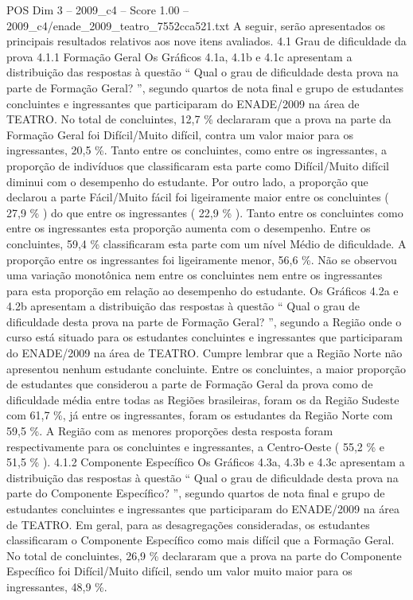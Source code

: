 \begin{textsample}{POS Dim 3 – 2009\_c4 – Score 1.00 – 2009\_c4/enade\_2009\_teatro\_7552cca521.txt}
A seguir, serão apresentados os principais resultados relativos aos nove itens avaliados. 4.1 Grau de dificuldade da prova 4.1.1 Formação Geral Os Gráficos 4.1a, 4.1b e 4.1c apresentam a distribuição das respostas à questão “ Qual o grau de dificuldade desta prova na parte de Formação Geral? ”, segundo quartos de nota final e grupo de estudantes concluintes e ingressantes que participaram do ENADE/2009 na área de TEATRO.
No total de concluintes, 12,7 \% declararam que a prova na parte da Formação Geral foi Difícil/Muito difícil, contra um valor maior para os ingressantes, 20,5 \%.
Tanto entre os concluintes, como entre os ingressantes, a proporção de indivíduos que classificaram esta parte como Difícil/Muito difícil diminui com o desempenho do estudante.
Por outro lado, a proporção que declarou a parte Fácil/Muito fácil foi ligeiramente maior entre os concluintes ( 27,9 \% ) do que entre os ingressantes ( 22,9 \% ).
Tanto entre os concluintes como entre os ingressantes esta proporção aumenta com o desempenho.
Entre os concluintes, 59,4 \% classificaram esta parte com um nível Médio de dificuldade.
A proporção entre os ingressantes foi ligeiramente menor, 56,6 \%.
Não se observou uma variação monotônica nem entre os concluintes nem entre os ingressantes para esta proporção em relação ao desempenho do estudante.
Os Gráficos 4.2a e 4.2b apresentam a distribuição das respostas à questão “ Qual o grau de dificuldade desta prova na parte de Formação Geral? ”, segundo a Região onde o curso está situado para os estudantes concluintes e ingressantes que participaram do ENADE/2009 na área de TEATRO.
Cumpre lembrar que a Região Norte não apresentou nenhum estudante concluinte.
Entre os concluintes, a maior proporção de estudantes que considerou a parte de Formação Geral da prova como de dificuldade média entre todas as Regiões brasileiras, foram os da Região Sudeste com 61,7 \%, já entre os ingressantes, foram os estudantes da Região Norte com 59,5 \%.
A Região com as menores proporções desta resposta foram respectivamente para os concluintes e ingressantes, a Centro-Oeste ( 55,2 \% e 51,5 \% ). 4.1.2 Componente Específico Os Gráficos 4.3a, 4.3b e 4.3c apresentam a distribuição das respostas à questão “ Qual o grau de dificuldade desta prova na parte do Componente Específico? ”, segundo quartos de nota final e grupo de estudantes concluintes e ingressantes que participaram do ENADE/2009 na área de TEATRO.
Em geral, para as desagregações consideradas, os estudantes classificaram o Componente Específico como mais difícil que a Formação Geral.
No total de concluintes, 26,9 \% declararam que a prova na parte do Componente Específico foi Difícil/Muito difícil, sendo um valor muito maior para os ingressantes, 48,9 \%.

\end{textsample}

